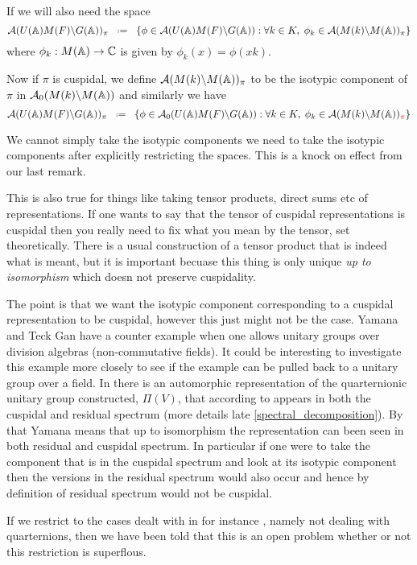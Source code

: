 If we will also need the space 
\[\mathcal{A}(U(\A)M(F) \backslash G(\A))_\pi \defeq \{\phi \in \mathcal{A}(U(\A)M(F) \backslash G(\A)) : \forall k\in K, \; \phi_k\in\mathcal{A}(M(k) \backslash M(\A))_\pi \}\]
where \(\phi_k: M(\A) \to \C\) is given by \(\phi_k(x) = \phi(xk)\).

Now if \(\pi\) is cuspidal, we define \(\mathcal{A}(M(k) \backslash M(\A))_\pi\) to be the isotypic component of \(\pi\) in \(\mathcal{A}_0(M(k) \backslash M(\A))\) and similarly we have 
\[\mathcal{A}(U(\A)M(F) \backslash G(\A))_\pi \defeq \{\phi \in \mathcal{A}_0(U(\A)M(F) \backslash G(\A)) : \forall k\in K, \; \phi_k\in\mathcal{A}(M(k) \backslash M(\A))_{\textcolor{red}{\pi}} \}\]
\begin{Remark}
    We cannot simply take the isotypic components we need to take the isotypic components after explicitly restricting the spaces. This is a knock on effect from our last remark.

    This is also true for things like taking tensor products, direct sums etc of representations. If one wants to say that the tensor of cuspidal representations is cuspidal then you really need to fix what you mean by the tensor, set theoretically. There is a usual construction of a tensor product that is indeed what is meant, but it is important becuase this thing is only unique \textit{up to isomorphism} which doesn not preserve cuspidality.
\end{Remark}

The point is that we want the isotypic component corresponding to a cuspidal representation to be cuspidal, however this just might not be the case. 
Yamana and Teck Gan have a counter example when one allows unitary groups over division algebras (non-commutative fields). It could be interesting to investigate this example more closely to see if the example can be pulled back to a unitary group over a field. In \cite{yamanaSiegelWeilFormulaQuaternionic2013} there is an automorphic representation of the quarternionic unitary group constructed, \(\Pi(V)\), that according to \cite[Rm. 7.12]{yamanaSiegelWeilFormulaQuaternionic2013} appears in both the cuspidal and residual spectrum (more details late \ref{spectral_decomposition}). By that Yamana means that up to isomorphism the representation can been seen in both residual and cuspidal spectrum. In particular if one were to take the component that is in the cuspidal spectrum and look at its isotypic component then the versions in the residual spectrum would also occur and hence by definition of residual spectrum would not be cuspidal.

If we restrict to the cases dealt with in for instance \cite{moeglinSpectralDecompositionEisenstein1995}, namely not dealing with quarternions, then we have been told that this is an open problem whether or not this restriction is superflous. 
